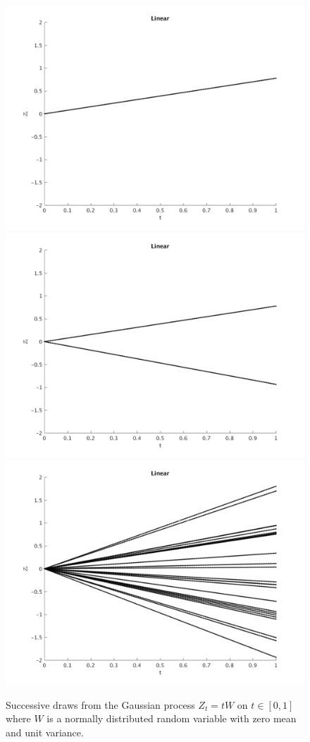 \begin{figure}
\centering
\includegraphics[scale=.45]{figures/linear1.png}
\includegraphics[scale=.45]{figures/linear2.png}
\includegraphics[scale=.45]{figures/linear25.png}
\caption{Successive draws from the Gaussian process $Z_t=tW$ on $t \in [0,1]$ 
where $W$ is a normally distributed random variable with zero mean and unit variance. 
\label{fig:randomlines}}
\end{figure}


